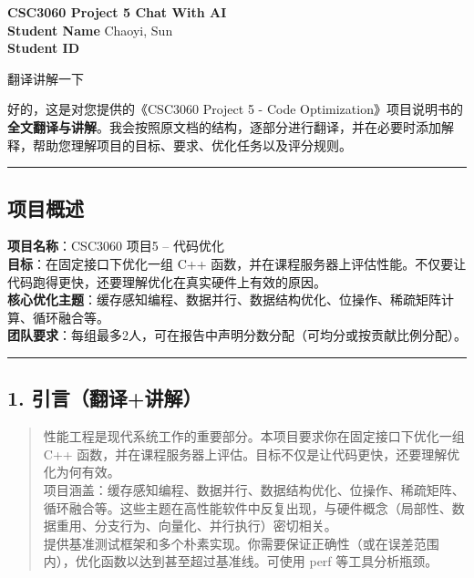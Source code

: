 \documentclass[11pt, a4paper]{article}
\begin{document}
\begin{center}
    \centering
    {\Huge \textbf{CSC3060 Project 5 Chat With AI}} \\[0.5cm]
    
    \textbf{Student Name} \quad Chaoyi, Sun \\[0.1cm]
    \textbf{Student ID}  \\[1cm]
\end{center}

\begin{userbox}
翻译讲解一下
\end{userbox}

\begin{aibox}
好的，这是对您提供的《CSC3060 Project 5 - Code Optimization》项目说明书的\textbf{全文翻译与讲解}。我会按照原文档的结构，逐部分进行翻译，并在必要时添加解释，帮助您理解项目的目标、要求、优化任务以及评分规则。

\begin{center}\rule{\textwidth}{0.4pt}\end{center}

\subsection*{项目概述}

\textbf{项目名称}：CSC3060 项目5 – 代码优化\\
\textbf{目标}：在固定接口下优化一组 C++ 函数，并在课程服务器上评估性能。不仅要让代码跑得更快，还要理解优化在真实硬件上有效的原因。\\
\textbf{核心优化主题}：缓存感知编程、数据并行、数据结构优化、位操作、稀疏矩阵计算、循环融合等。\\
\textbf{团队要求}：每组最多2人，可在报告中声明分数分配（可均分或按贡献比例分配）。

\begin{center}\rule{\textwidth}{0.4pt}\end{center}

\subsection*{1. 引言（翻译+讲解）}

\begin{quote}
性能工程是现代系统工作的重要部分。本项目要求你在固定接口下优化一组 C++ 函数，并在课程服务器上评估。目标不仅是让代码更快，还要理解优化为何有效。\\
项目涵盖：缓存感知编程、数据并行、数据结构优化、位操作、稀疏矩阵、循环融合等。这些主题在高性能软件中反复出现，与硬件概念（局部性、数据重用、分支行为、向量化、并行执行）密切相关。\\
提供基准测试框架和多个朴素实现。你需要保证正确性（或在误差范围内），优化函数以达到甚至超过基准线。可使用 perf 等工具分析瓶颈。
\end{quote}


\end{aibox}
\end{document}
